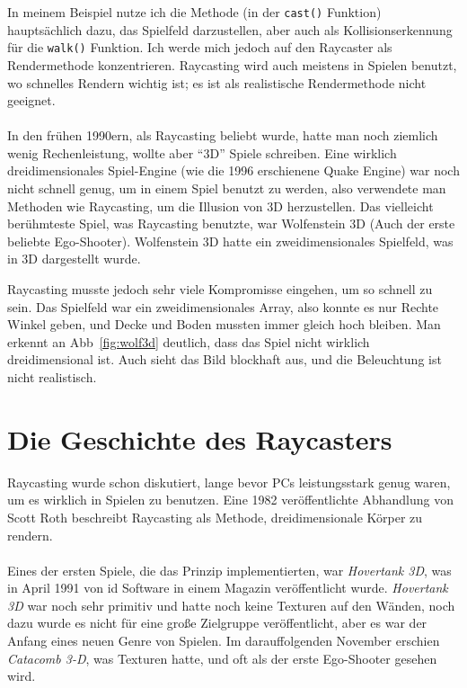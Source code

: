 \documentclass[a4paper,12pt]{report}
\begin{document}
In meinem Beispiel nutze ich die Methode (in der \texttt{cast()} Funktion) hauptsächlich dazu, das Spielfeld darzustellen, aber auch als Kollisionserkennung für die \texttt{walk()} Funktion. Ich werde mich jedoch auf den Raycaster als Rendermethode konzentrieren. Raycasting wird auch meistens in Spielen benutzt, wo schnelles Rendern wichtig ist; es ist als realistische Rendermethode nicht geeignet.

\paragraph*{}
In den frühen 1990ern, als Raycasting beliebt wurde, hatte man noch ziemlich wenig Rechenleistung, wollte aber ``3D'' Spiele schreiben. Eine wirklich dreidimensionales Spiel-Engine (wie die 1996 erschienene Quake Engine) war noch nicht schnell genug, um in einem Spiel benutzt zu werden, also verwendete man Methoden wie Raycasting, um die Illusion von 3D herzustellen. Das vielleicht berühmteste Spiel, was Raycasting benutzte, war Wolfenstein 3D (Auch der erste beliebte Ego-Shooter). Wolfenstein 3D hatte ein zweidimensionales Spielfeld, was in 3D dargestellt wurde.

Raycasting musste jedoch sehr viele Kompromisse eingehen, um so schnell zu sein. Das Spielfeld war ein zweidimensionales Array, also konnte es nur Rechte Winkel geben, und Decke und Boden mussten immer gleich hoch bleiben. Man erkennt an Abb~\ref{fig:wolf3d} deutlich, dass das Spiel nicht wirklich dreidimensional ist. Auch sieht das Bild blockhaft aus, und die Beleuchtung ist nicht realistisch.

\section{Die Geschichte des Raycasters}
Raycasting wurde schon diskutiert, lange bevor PCs leistungsstark genug waren, um es wirklich in Spielen zu benutzen. Eine 1982 veröffentlichte Abhandlung von Scott Roth beschreibt Raycasting als Methode, dreidimensionale Körper zu rendern.
\paragraph*{}
Eines der ersten Spiele, die das Prinzip implementierten, war \textit{Hovertank 3D}, was in April 1991 von id Software in einem Magazin veröffentlicht wurde. \textit{Hovertank 3D} war noch sehr primitiv und hatte noch keine Texturen auf den Wänden, noch dazu wurde es nicht für eine große Zielgruppe veröffentlicht, aber es war der Anfang eines neuen Genre von Spielen. Im darauffolgenden November erschien \textit{Catacomb 3-D}, was Texturen hatte, und oft als der erste Ego-Shooter gesehen wird.
\end{document}
